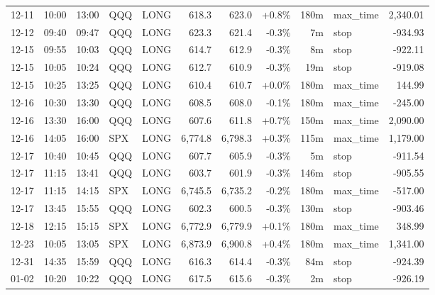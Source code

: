 \documentclass[11pt,a4paper,twoside]{article}
\begin{document}
\begin{center}
\begin{longtable}{>{\color{txtmain}}l l l l l r r r r >{\color{txtmain}}l r}
12-11 & 10:00 & 13:00 & QQQ & LONG & 618.3 & 623.0 & \textcolor{wingreen}{+0.8\%} & 180m & max\_time & \textcolor{wingreen}{2,340.01} \\
12-12 & 09:40 & 09:47 & QQQ & LONG & 623.3 & 621.4 & \textcolor{lossred}{-0.3\%} & 7m & stop & \textcolor{lossred}{-934.93} \\
12-15 & 09:55 & 10:03 & QQQ & LONG & 614.7 & 612.9 & \textcolor{lossred}{-0.3\%} & 8m & stop & \textcolor{lossred}{-922.11} \\
12-15 & 10:05 & 10:24 & QQQ & LONG & 612.7 & 610.9 & \textcolor{lossred}{-0.3\%} & 19m & stop & \textcolor{lossred}{-919.08} \\
12-15 & 10:25 & 13:25 & QQQ & LONG & 610.4 & 610.7 & \textcolor{wingreen}{+0.0\%} & 180m & max\_time & \textcolor{wingreen}{144.99} \\
12-16 & 10:30 & 13:30 & QQQ & LONG & 608.5 & 608.0 & \textcolor{lossred}{-0.1\%} & 180m & max\_time & \textcolor{lossred}{-245.00} \\
12-16 & 13:30 & 16:00 & QQQ & LONG & 607.6 & 611.8 & \textcolor{wingreen}{+0.7\%} & 150m & max\_time & \textcolor{wingreen}{2,090.00} \\
12-16 & 14:05 & 16:00 & SPX & LONG & 6,774.8 & 6,798.3 & \textcolor{wingreen}{+0.3\%} & 115m & max\_time & \textcolor{wingreen}{1,179.00} \\
12-17 & 10:40 & 10:45 & QQQ & LONG & 607.7 & 605.9 & \textcolor{lossred}{-0.3\%} & 5m & stop & \textcolor{lossred}{-911.54} \\
12-17 & 11:15 & 13:41 & QQQ & LONG & 603.7 & 601.9 & \textcolor{lossred}{-0.3\%} & 146m & stop & \textcolor{lossred}{-905.55} \\
12-17 & 11:15 & 14:15 & SPX & LONG & 6,745.5 & 6,735.2 & \textcolor{lossred}{-0.2\%} & 180m & max\_time & \textcolor{lossred}{-517.00} \\
12-17 & 13:45 & 15:55 & QQQ & LONG & 602.3 & 600.5 & \textcolor{lossred}{-0.3\%} & 130m & stop & \textcolor{lossred}{-903.46} \\
12-18 & 12:15 & 15:15 & SPX & LONG & 6,772.9 & 6,779.9 & \textcolor{wingreen}{+0.1\%} & 180m & max\_time & \textcolor{wingreen}{348.99} \\
12-23 & 10:05 & 13:05 & SPX & LONG & 6,873.9 & 6,900.8 & \textcolor{wingreen}{+0.4\%} & 180m & max\_time & \textcolor{wingreen}{1,341.00} \\
12-31 & 14:35 & 15:59 & QQQ & LONG & 616.3 & 614.4 & \textcolor{lossred}{-0.3\%} & 84m & stop & \textcolor{lossred}{-924.39} \\
01-02 & 10:20 & 10:22 & QQQ & LONG & 617.5 & 615.6 & \textcolor{lossred}{-0.3\%} & 2m & stop & \textcolor{lossred}{-926.19} \\

\end{longtable}
\end{center}
\end{document}
